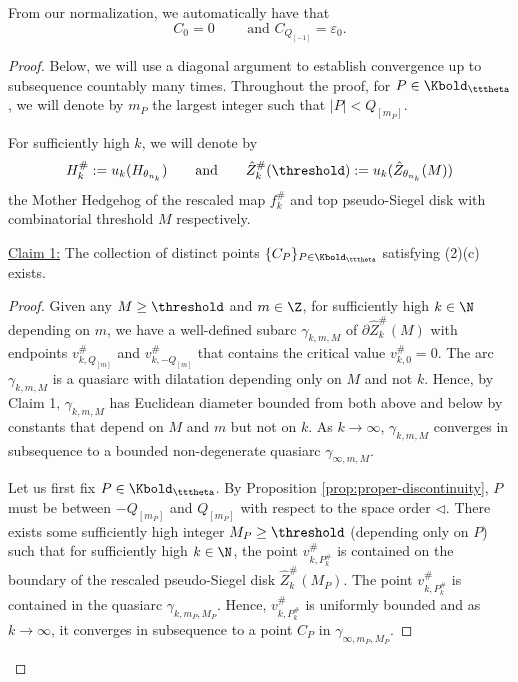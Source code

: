 \documentclass{amsart}
\begin{document}
From our normalization, we automatically have that
\[
    C_0 = 0 \qquad \text{ and } C_{Q_{[-1]}} = \varepsilon_0.
\]

\begin{proof}
    Below, we will use a diagonal argument to establish convergence up to subsequence countably many times.
    Throughout the proof, for $P \in \Kbold_{\tttheta}$, we will denote by $m_P$ the largest integer such that $|P|< Q_{[m_P]}$.
    
    For sufficiently high $k$, we will denote by
    \[
        H_k^{\#} := u_k(H_{\theta_{n_k}}) 
        \qquad \text{and} \qquad
        \hat{Z}_k^{\#}(\threshold) := u_k( \hat{Z}_{\theta_{n_k}}(M))
    \]
    the Mother Hedgehog of the rescaled map $f_k^{\#}$ and top pseudo-Siegel disk with combinatorial threshold $M$ respectively.
    \vspace{0.1in}

    \noindent\underline{Claim 1:} The collection of distinct points $\{C_P\}_{P \in \Kbold_{\tttheta}}$ satisfying (2)(c) exists.

    \begin{proof}
        Given any $M \geq \threshold$ and $m \in \Z$, for sufficiently high $k \in \N$ depending on $m$, we have a well-defined subarc $\gamma_{k,m,M}$ of $\partial \hat{Z}_k^{\#}(M)$ with endpoints $v^{\#}_{k,Q_{[m]}}$ and $v^{\#}_{k,-Q_{[m]}}$ that contains the critical value $v^{\#}_{k,0} = 0$.
        The arc $\gamma_{k,m,M}$ is a quasiarc with dilatation depending only on $M$ and not $k$.
        Hence, by Claim 1, $\gamma_{k,m,M}$ has Euclidean diameter bounded from both above and below by constants that depend on $M$ and $m$ but not on $k$.
        As $k \to \infty$, $\gamma_{k,m,M}$ converges in subsequence to a bounded non-degenerate quasiarc $\gamma_{\infty,m,M}$.
        
        Let us first fix $P \in \Kbold_{\tttheta}$. 
        By Proposition \ref{prop:proper-discontinuity}, $P$ must be between $-Q_{[m_P]}$ and $Q_{[m_P]}$ with respect to the space order $\lhd$.
        There exists some sufficiently high integer $M_P \geq \threshold$ (depending only on $P$) such that for sufficiently high $k \in \N$, the point $v^{\#}_{k,P_k^{\#}}$ is contained on the boundary of the rescaled pseudo-Siegel disk $\hat{Z}_k^{\#}(M_P)$.
        The point $v^{\#}_{k,P_k^{\#}}$ is contained in the quasiarc $\gamma_{k,m_P, M_P}$.
        Hence, $v^{\#}_{k,P_k^{\#}}$ is uniformly bounded and as $k \to \infty$, it converges in subsequence to a point $C_P$ in $\gamma_{\infty,m_P,M_P}$.


\end{proof}
\end{proof}
\end{document}
